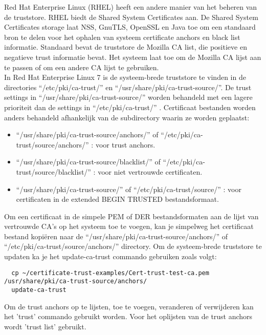 Red Hat Enterprise Linux (RHEL) heeft een andere manier van het beheren van de truststore. RHEL biedt de Shared System Certificates aan.
De Shared System Certificates storage laat NSS, GnuTLS, OpenSSL en Java toe om een standaard bron te delen voor het ophalen van systeem certificate anchors en black list informatie.
Standaard bevat de truststore de Mozilla CA list, die positieve en negatieve trust informatie bevat. Het systeem laat toe om de Mozilla CA lijst aan te passen of om een andere CA lijst te gebruiken. \autocite{RHELtruststore} \\

In Red Hat Enterprise Linux 7 is de systeem-brede truststore te vinden in de directories ``/etc/pki/ca-trust/'' en ``/usr/share/pki/ca-trust-source/''. De trust settings in ``/usr/share/pki/ca-trust-source/'' worden behandeld met een lagere prioriteit dan de settings in ``/etc/pki/ca-trust/'' .
Certificaat bestanden worden anders behandeld afhankelijk van de subdirectory waarin ze worden geplaatst:
\begin{itemize}
  \item ``/usr/share/pki/ca-trust-source/anchors/'' of ``/etc/pki/ca-trust/source/anchors/'' : voor trust anchors.
  \item ``/usr/share/pki/ca-trust-source/blacklist/'' of ``/etc/pki/ca-trust/source/blacklist/'' : voor niet vertrouwde certificaten.
  \item ``/usr/share/pki/ca-trust-source/'' of ``/etc/pki/ca-trust/source/'' : voor certificaten in de extended BEGIN TRUSTED bestandsformaat.
\end{itemize} \autocite{RHELtruststore}

Om een certificaat in de simpele PEM of DER bestandsformaten aan de lijst van vertrouwde CA's op het systeem toe te voegen, kan je simpelweg het certificaat bestand kopiëren naar de ``/usr/share/pki/ca-trust-source/anchors/'' of ``/etc/pki/ca-trust/source/anchors/'' directory. Om de systeem-brede truststore te updaten ka je het update-ca-trust commando gebruiken zoals volgt:
\begin{verbatim}
  cp ~/certificate-trust-examples/Cert-trust-test-ca.pem /usr/share/pki/ca-trust-source/anchors/
  update-ca-trust
\end{verbatim} 

Om de trust anchors op te lijsten, toe te voegen, veranderen of verwijderen kan het 'trust' commando gebruikt worden.
Voor het oplijsten van de trust anchors wordt 'trust list' gebruikt. \\


